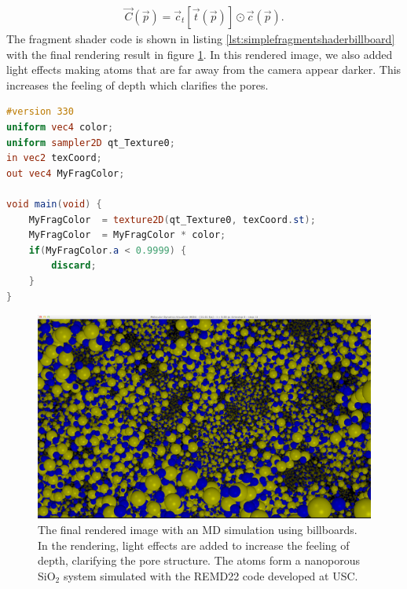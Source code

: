 \begin{align}
	\nonumber
	\vec C(\vec p) = \vec c_t[\vec t(\vec p)] \odot \vec c(\vec p).
\end{align}
The fragment shader code is shown in listing \ref{lst:simplefragmentshaderbillboard} with the final rendering result in figure \ref{fig:visualization_billboard_md}. In this rendered image, we also added light effects making atoms that are far away from the camera appear darker. This increases the feeling of depth which clarifies the pores.
\begin{lstlisting}[caption=billboardFragmentShader.glsl, label=lst:simplefragmentshaderbillboard, language=GLSL]
#version 330
uniform vec4 color;
uniform sampler2D qt_Texture0;
in vec2 texCoord;
out vec4 MyFragColor;

void main(void) {
    MyFragColor  = texture2D(qt_Texture0, texCoord.st);
    MyFragColor  = MyFragColor * color;
    if(MyFragColor.a < 0.9999) {
        discard;
    }
}

\end{lstlisting}

\begin{figure}[h]
\begin{center}
\includegraphics[width=\textwidth, trim=0cm 0cm 0cm 0cm, clip]{visualization/figures/billboards_md_visualization.png}
\end{center}
\caption{The final rendered image with an MD simulation using billboards. In the rendering, light effects are added to increase the feeling of depth, clarifying the pore structure. The atoms form a nanoporous SiO$_2$ system simulated with the REMD22 code developed at USC.}
\label{fig:visualization_billboard_md}
\end{figure}

